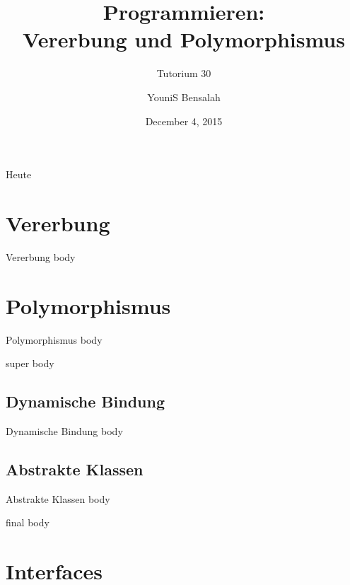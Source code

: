 \documentclass[18pt]{beamer}
\title[Vererbung und Polymorphismus]{Programmieren:\\ Vererbung und Polymorphismus}
\subtitle{Tutorium 30}
\author{YouniS Bensalah}
\date{December 4, 2015}
\institute{Chair for Software Design and Quality}
\begin{document}

\begin{frame}
\titlepage
\end{frame}

\begin{frame}{Heute}
\tableofcontents
\end{frame}

\section{Vererbung}

\begin{frame}{Vererbung}
    body
\end{frame}

\section{Polymorphismus}

\begin{frame}{Polymorphismus}
    body
\end{frame}

\begin{frame}{super}
    body
\end{frame}

\subsection{Dynamische Bindung}

\begin{frame}{Dynamische Bindung}
    body
\end{frame}

\subsection{Abstrakte Klassen}

\begin{frame}{Abstrakte Klassen}
    body
\end{frame}

\begin{frame}{final}
    body
\end{frame}

\section{Interfaces}
\end{document}
